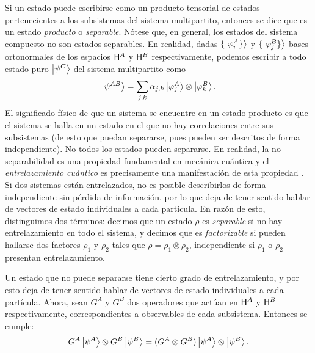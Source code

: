 Si un estado puede escribirse como un producto tensorial de estados pertenecientes a los subsistemas del sistema multipartito, entonces se dice que es un estado \textit{producto} o \textit{separable}. Nótese que, en general, los estados del sistema compuesto no son estados separables. En realidad, dadas $\{\ket{\varphi_{i}^{A}\}}$ y $\{\ket{\varphi_{j}^{B}\}}$ bases ortonormales de los espacios ${\sf H}^{A}$ y ${\sf H}^{B}$ respectivamente, podemos escribir a todo estado puro $\ket{\psi^{C}}$ del sistema multipartito como
\begin{equation}
    \ket{\psi^{AB}}=\sum_{j,k}\alpha_{j,k}\ket{\varphi_{j}^{A}}\otimes\ket{\varphi_{k}^{B}}.\nonumber
\end{equation}
El significado físico de que un sistema se encuentre en un estado producto es que el sistema se halla en un estado en el que no hay correlaciones entre sus subsistemas (de esto que puedan separarse, pues pueden ser descritos de forma independiente). No todos los estados pueden separarse. En realidad, la no-separabilidad es una propiedad fundamental en mecánica cuántica y el \textit{entrelazamiento cuántico} es precisamente una manifestación de esta propiedad \cite{Holevo}. Si dos sistemas están entrelazados, no es posible describirlos de forma independiente sin pérdida de información, por lo que deja de tener sentido hablar de vectores de estado individuales a cada partícula. En razón de esto, distinguimos dos términos: decimos que un estado $\rho$ es \textit{separable} si no hay entrelazamiento en todo el sistema, y decimos que es \textit{factorizable} si pueden hallarse dos factores $\rho_{1}$ y $\rho_{2}$ tales que $\rho=\rho_{1}\otimes\rho_{2}$, independiente si $\rho_{1}$ o $\rho_{2}$ presentan entrelazamiento.

Un estado que no puede separarse tiene cierto grado de entrelazamiento, y por esto deja de tener sentido hablar de vectores de estado individuales a cada partícula. Ahora, sean $G^{A}$ y $G^{B}$ dos operadores que actúan en ${\sf H}^{A}$ y ${\sf H}^{B}$ respectivamente, correspondientes a observables de cada subsistema. Entonces se cumple:
\begin{equation}
    G^{A}\ket{\psi^{A}}\otimes G^{B}\ket{\psi^{B}}=(G^{A}\otimes G^{B})\ket{\psi^{A}}\otimes\ket{\psi^{B}}.\nonumber
\end{equation}


